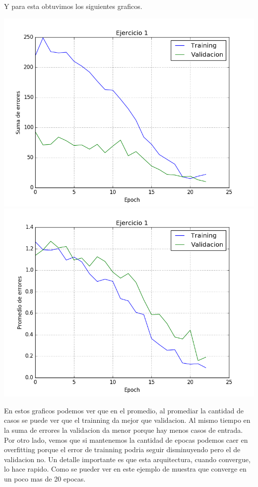 Y para esta obtuvimos los siguientes graficos.


\includegraphics[scale=0.4]{img/ej100109155sum}
\includegraphics[scale=0.4]{img/ej100109155mean}

En estos graficos podemos ver que en el promedio, al promediar la cantidad de casos se puede ver que el trainning da mejor que validacion. Al mismo tiempo en la suma de errores la validacion da menor porque hay menos casos de entrada. 
Por otro lado, vemos que si mantenemos la cantidad de epocas podemos caer en overfitting porque el error de trainning podria seguir disminuyendo pero el de validacion no.
Un detalle importante es que esta arquitectura, cuando convergue, lo hace rapido. Como se pueder ver en este ejemplo de muestra que converge en un poco mas de 20 epocas.

